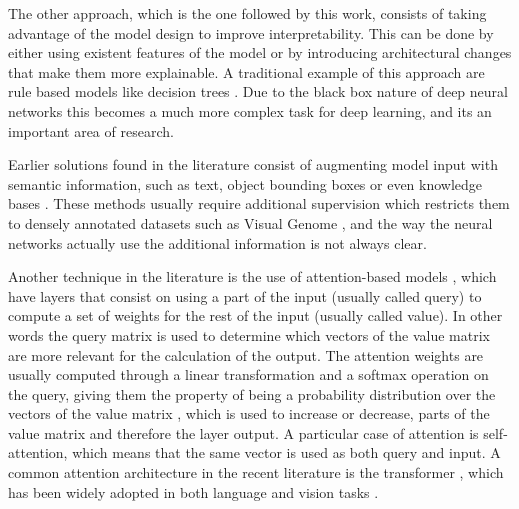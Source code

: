 The other approach, which is the one followed by this work, consists of taking advantage of the model
design to improve interpretability. This can be done by either using existent features of the model
or by introducing architectural changes that make them more explainable. A traditional  example of
this approach are rule based models like  decision trees \cite{breiman_tree}. Due to the black box
nature of deep neural networks this becomes a much more complex task for deep learning, and its an
important area of research.

Earlier solutions found in the literature consist of augmenting
model input with semantic information, such as text, object bounding boxes or even knowledge bases
\cite{dong_semantic, zhuo_video, li_knowledge}. These methods usually require additional supervision
which restricts them to densely annotated datasets such as Visual Genome \cite{krishna_visualgenome},
and the way the neural networks actually  use the additional information is not always clear.

Another technique in the literature is the use of attention-based models \cite{bahdanau_attention},
which have layers that consist on using a part of the input (usually called query) to compute a set of weights
for the rest of the input (usually called value). In other words the query matrix is used
to determine which vectors of the value matrix are more relevant for the calculation of the output.
The attention weights are usually computed through
a linear transformation and a softmax operation on the query, giving them the property of being a probability
distribution over the vectors of the value matrix  \cite{cordonnier_relationship}, which is used to increase or decrease,
parts of the value matrix and therefore the layer output. A particular case of attention is
self-attention, which means that the same vector is used as both query and input. A common attention architecture
in the recent literature is the transformer \cite{vaswani_attention}, which has been widely adopted in both
language and vision tasks \cite{devlin_bert, radford_gpt, bello_attention, li_visualbert, carion_object}.


